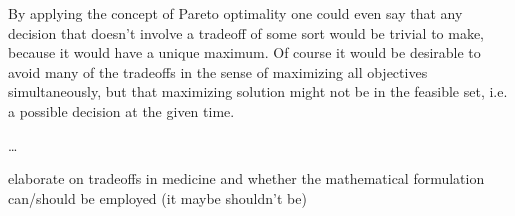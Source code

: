 	By applying the concept of Pareto optimality one could even say that any decision that doesn't involve a tradeoff of some sort would be trivial to make, because it would have a unique maximum.
	Of course it would be desirable to avoid many of the tradeoffs in the sense of maximizing all objectives simultaneously, but that maximizing solution might not be in the feasible set, i.e. a possible decision at the given time.

	\dots

	elaborate on tradeoffs in medicine and whether the mathematical formulation can/should be employed (it maybe shouldn't be)
